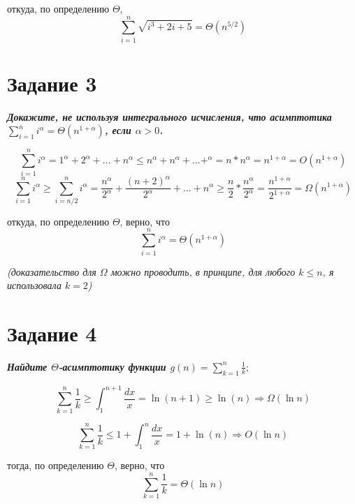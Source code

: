\documentclass{article}
\begin{document}
откуда, по определению $\Theta$, 
$$\sum\limits_{i=1}^n \sqrt{i^3+2i+5} = \Theta(n^{5/2})$$
\bigskip

\section*{\textbf{Задание 3}}

\textbf{\textit{Докажите, не используя интегрального исчисления, что асимптотика $\sum^n_{i=1} i^{\alpha}
= \Theta(n^{1+\alpha})$, если
$\alpha > 0$.}}

$$\sum\limits_{i=1}^n i^\alpha = 1^\alpha + 2^\alpha + ... + n^\alpha \leq n^\alpha + n^\alpha + ... + ^\alpha = n*n^\alpha = n^{1+\alpha} = O(n^{1+\alpha})$$ 
\medskip
$$\sum\limits_{i=1}^n i^\alpha \geq \sum\limits_{i=n/2}^n i^\alpha = \frac{n^\alpha}{2^\alpha} + \frac{(n+2)^\alpha}{2^\alpha} + ... + n^\alpha \geq \frac{n}{2} * \frac{n^\alpha}{2^\alpha} = \frac{n^{1 + \alpha}}{2^{1 + \alpha}} = \Omega(n^{1+\alpha})$$ 

откуда, по определению $\Theta$, верно, что 
 $$\sum\limits_{i=1}^n i^\alpha = \Theta(n^{1+\alpha})$$

\textit{(доказательство для $\Omega$ можно проводить, в принципе, для любого $k \leq n$, я использовала $k = 2$)} 
\bigskip

\section*{\textbf{Задание 4}}

\textbf{\textit{Найдите $\Theta$-асимптотику функции
$g(n) = \sum ^n_{k=1} \frac{1}{k};$}}

$$\sum ^n_{k=1} \frac{1}{k} \geq \int_1^{n+1} \frac{dx}{x}= \ln(n + 1) \geq \ln(n) \Rightarrow  \Omega(\ln n)$$

$$\sum ^n_{k=1} \frac{1}{k} \leq 1 + \int_1^n \frac{dx}{x}= 1 + \ln(n) \Rightarrow  O(\ln n)$$

тогда, по определению $\Theta$, верно, что 
$$\sum ^n_{k=1} \frac{1}{k} = \Theta(\ln n)$$
\end{document}
